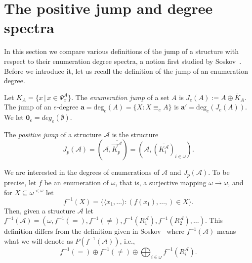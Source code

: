 \documentclass[11pt]{amsart}
\newcommand{\A}{{\mathcal{A}}}
\newcommand{\N}{\omega}
\begin{document}
\section{The positive jump and degree spectra}\label{sec:jumps}
In this section we compare various definitions of the jump of a structure with respect to their enumeration degree spectra, a notion first studied by Soskov~\cite{soskov2004}. Before we introduce it, let us recall the definition of the jump of an enumeration degree. 
\begin{defn}
    Let $K_A = \{x \, | \, x \in \Psi^A_x\}$. The \emph{enumeration jump} of a set $A$ is $J_e(A) := A \oplus \overline{K}_A$. The jump of an $e$-degree $\mathbf{a} = \text{deg}_e(A) = \{X : X \equiv_e A\}$ is $\mathbf{a}' = \text{deg}_e(J_e(A))$. We let $\boldsymbol{0}_e = deg_e(\emptyset)$.
\end{defn}
\begin{defn}
    The \emph{positive jump} of a structure $\A$ is the structure 
    \begin{equation*}
        J_p(\A)=(\A, \overline{\vec K^{\A}_p})=(\A,(\overline{K^{\A}_i})_{i\in\omega}).
    \end{equation*}
\end{defn}
We are interested in the degrees of enumerations of $\A$ and $J_p(\A)$. To be precise,
let $f$ be an enumeration of $\omega$, that is, a surjective mapping $\omega \rightarrow \omega$, and for $X\subseteq \omega^{<\omega}$ let
\[ f^{-1}(X)=\{ \langle x_1,\dots\rangle: ( f(x_1),\dots,
)\in X\}.\]
Then, given a structure $\A$ let $f^{-1}(\A)=(\N, f^{-1}(=),f^{-1}(\neq),f^{-1}(R_1^\A),f^{-1}(R_2^\A),\dots)$.
This definition differs from the definition given in Soskov~\cite{soskov2004} where $f^{-1}(\A)$ means what we will denote as $P(f^{-1}(\A))$, i.e.,
\[ f^{-1}(=)\oplus f^{-1}(\neq)\oplus \bigoplus_{i\in\N} f^{-1}(R_i^\A). \]
\end{document}
